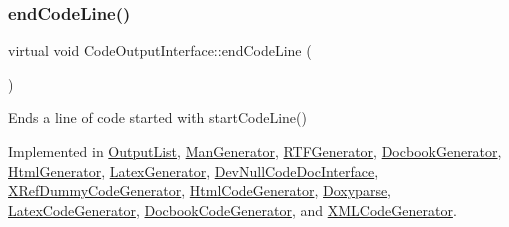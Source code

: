 \mbox{\label{class_code_output_interface_afac5763eafc78f93b82691fb9a6dcff7}} 
\subsubsection{\texorpdfstring{endCodeLine()}{endCodeLine()}}
{\footnotesize\ttfamily virtual void Code\+Output\+Interface\+::end\+Code\+Line (\begin{DoxyParamCaption}{ }\end{DoxyParamCaption})\hspace{0.3cm}{\ttfamily [pure virtual]}}

Ends a line of code started with start\+Code\+Line() 

Implemented in \mbox{\hyperlink{class_output_list_a0e08c34eb6d9058342d0bd7fdc2a453d}{Output\+List}}, \mbox{\hyperlink{class_man_generator_a0f0040036147c71754651d0701029f70}{Man\+Generator}}, \mbox{\hyperlink{class_r_t_f_generator_a3f63e2fedfb61f656e35df2054a6d772}{R\+T\+F\+Generator}}, \mbox{\hyperlink{class_docbook_generator_a8f7445243e87fede91ba577d5549b907}{Docbook\+Generator}}, \mbox{\hyperlink{class_html_generator_a509e9b78f035f58e533cef4f79bf5401}{Html\+Generator}}, \mbox{\hyperlink{class_latex_generator_a87b0106936769e1226310df32ec5e1a6}{Latex\+Generator}}, \mbox{\hyperlink{class_dev_null_code_doc_interface_a5aeb9fdbb29f60058c55adecefab457a}{Dev\+Null\+Code\+Doc\+Interface}}, \mbox{\hyperlink{class_x_ref_dummy_code_generator_a6b4a0fd7e9d9b39e05bf65f7dcc1021e}{X\+Ref\+Dummy\+Code\+Generator}}, \mbox{\hyperlink{class_html_code_generator_ab0909b2a97301c8da4fcbf83831c84b3}{Html\+Code\+Generator}}, \mbox{\hyperlink{class_doxyparse_a57e49f80ef4f8765666507c060af4dd2}{Doxyparse}}, \mbox{\hyperlink{class_latex_code_generator_a8e32150386fe38561a0b2c82611fee9d}{Latex\+Code\+Generator}}, \mbox{\hyperlink{class_docbook_code_generator_ab457dd3ab8b99073d9d2cc6f566bb712}{Docbook\+Code\+Generator}}, and \mbox{\hyperlink{class_x_m_l_code_generator_a47927ff273870cc7713f2d20e8c2beb3}{X\+M\+L\+Code\+Generator}}.

\mbox{\label{class_code_output_interface_a2b8ac05a391dae36793aa3aa8714a0f6}} 
